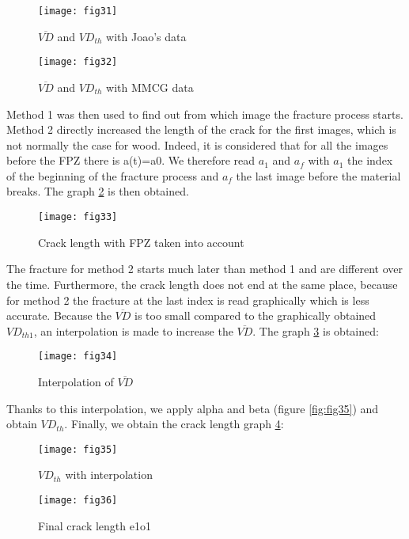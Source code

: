 \begin{figure}[htp]
	\begin{minipage}[c]{.46\linewidth}
		\centering
		\texttt{[image: fig31]}
		\caption{$\overline{VD}$ and $VD_{th}$ with Joao's data}
		\label{fig:fig31}
	\end{minipage}
	\hfill%
	\begin{minipage}[c]{.46\linewidth}
		\centering
		\texttt{[image: fig32]}
		\caption{$\overline{VD}$ and $VD_{th}$ with MMCG data}
		\label{fig:fig32}
	\end{minipage}
\end{figure}


Method 1 was then used to find out from which image the fracture process starts. Method 2 directly increased the length of the crack for the first images, which is not normally the case for wood.  Indeed, it is considered that for all the images before the FPZ there is a(t)=a0. We therefore read $a_1$ and $a_f$ with $a_1$ the index of the beginning of the fracture process and $a_f$ the last image before the material breaks. The graph \ref{fig:fig33} is then obtained.


\begin{figure}[htp]
	\centering
	\texttt{[image: fig33]}
	\caption{Crack length with FPZ taken into account}
	\label{fig:fig33}
\end{figure}

The fracture for method 2 starts much later than method 1 and are different over the time. Furthermore, the crack length does not end at the same place, because for method 2 the fracture at the last index is read graphically which is less accurate.
Because the $\overline{VD}$ is too small compared to the graphically obtained $VD_{th1}$, an interpolation is made to increase the $\overline{VD}$. The graph \ref{fig:fig34} is obtained:

\begin{figure}[htp]
	\centering
	\texttt{[image: fig34]}
	\caption{Interpolation of $\overline{VD}$}
	\label{fig:fig34}
\end{figure}

Thanks to this interpolation, we apply alpha and beta (figure \ref{fig:fig35}) and obtain $VD_{th}$. Finally, we obtain the crack length graph \ref{fig:fig36}:

\begin{figure}[h]
	\begin{minipage}[c]{.46\linewidth}
		\centering
		\texttt{[image: fig35]}
		\caption{$VD_{th}$ with interpolation}
		\label{fig:fig35}
	\end{minipage}
	\hfill%
	\begin{minipage}[c]{.46\linewidth}
		\centering
		\texttt{[image: fig36]}
		\caption{Final crack length e1o1}
		\label{fig:fig36}
	\end{minipage}
\end{figure}

